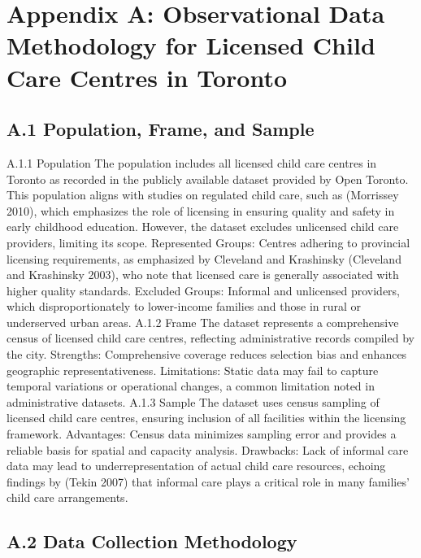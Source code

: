 \documentclass[
  letterpaper,
  DIV=11,
  numbers=noendperiod]{scrartcl}
\begin{document}
\section{Appendix A: Observational Data Methodology for Licensed Child
Care Centres in
Toronto}\label{appendix-a-observational-data-methodology-for-licensed-child-care-centres-in-toronto}

\subsection{A.1 Population, Frame, and
Sample}\label{a.1-population-frame-and-sample}

A.1.1 Population The population includes all licensed child care centres
in Toronto as recorded in the publicly available dataset provided by
Open Toronto. This population aligns with studies on regulated child
care, such as (Morrissey 2010), which emphasizes the role of licensing
in ensuring quality and safety in early childhood education. However,
the dataset excludes unlicensed child care providers, limiting its
scope. Represented Groups: Centres adhering to provincial licensing
requirements, as emphasized by Cleveland and Krashinsky (Cleveland and
Krashinsky 2003), who note that licensed care is generally associated
with higher quality standards. Excluded Groups: Informal and unlicensed
providers, which disproportionately to lower-income families and those
in rural or underserved urban areas. A.1.2 Frame The dataset represents
a comprehensive census of licensed child care centres, reflecting
administrative records compiled by the city. Strengths: Comprehensive
coverage reduces selection bias and enhances geographic
representativeness. Limitations: Static data may fail to capture
temporal variations or operational changes, a common limitation noted in
administrative datasets. A.1.3 Sample The dataset uses census sampling
of licensed child care centres, ensuring inclusion of all facilities
within the licensing framework. Advantages: Census data minimizes
sampling error and provides a reliable basis for spatial and capacity
analysis. Drawbacks: Lack of informal care data may lead to
underrepresentation of actual child care resources, echoing findings by
(Tekin 2007) that informal care plays a critical role in many families'
child care arrangements.

\subsection{A.2 Data Collection
Methodology}\label{a.2-data-collection-methodology}
\end{document}
